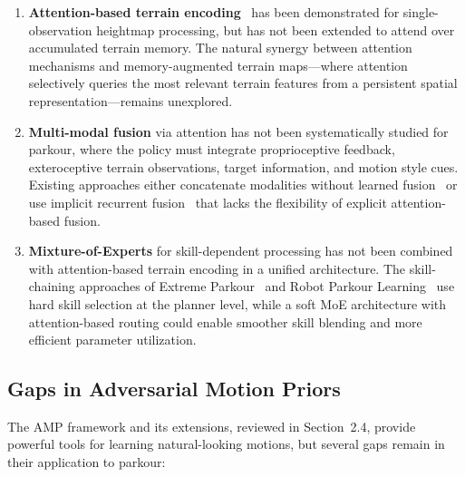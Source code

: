 \begin{enumerate}[leftmargin=2em]
\item \textbf{Attention-based terrain encoding}~\cite{he2024attentionmap} has been demonstrated for single-observation heightmap processing, but has not been extended to attend over accumulated terrain memory. The natural synergy between attention mechanisms and memory-augmented terrain maps---where attention selectively queries the most relevant terrain features from a persistent spatial representation---remains unexplored.

\item \textbf{Multi-modal fusion} via attention has not been systematically studied for parkour, where the policy must integrate proprioceptive feedback, exteroceptive terrain observations, target information, and motion style cues. Existing approaches either concatenate modalities without learned fusion~\cite{zhuang2024humanoidparkour} or use implicit recurrent fusion~\cite{nahraendra2024dreamwaq} that lacks the flexibility of explicit attention-based fusion.

\item \textbf{Mixture-of-Experts} for skill-dependent processing has not been combined with attention-based terrain encoding in a unified architecture. The skill-chaining approaches of Extreme Parkour~\cite{cheng2024extremeparkour} and Robot Parkour Learning~\cite{zhuang2024robotparkour} use hard skill selection at the planner level, while a soft MoE architecture with attention-based routing could enable smoother skill blending and more efficient parameter utilization.
\end{enumerate}

\subsection{Gaps in Adversarial Motion Priors}

The AMP framework and its extensions, reviewed in Section~2.4, provide powerful tools for learning natural-looking motions, but several gaps remain in their application to parkour:

